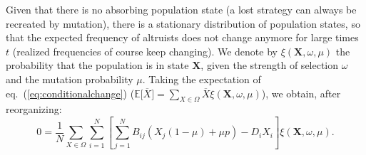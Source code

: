 \documentclass[11pt, letterpaper]{article}
\renewcommand{\eqref}[1]{\textup{{\normalfont eq.~(\ref{#1}}\normalfont)}}
\newcommand{\Esp}[1]{\mathbb{E}\big[ #1\big]}%
\begin{document}
Given that there is no absorbing population state (a lost strategy can always be recreated by mutation), there is a stationary distribution of population states, so that the expected frequency of altruists does not change anymore for large times~$t$ (realized frequencies of course keep changing). We denote by $\xi(\mathbf{X}, \omega, \mu)$ the probability that the population is in state $\mathbf{X}$, given the strength of selection $\omega$ and the mutation probability $\mu$. Taking the expectation of \eqref{eq:conditionalchange} ($\Esp{\overline{X}} = \sum_{X \in \Omega} \overline{X}\xi(\mathbf{X}, \omega, \mu)$), we obtain, after reorganizing:
\begin{equation}\label{eq:statdist}
0 = \frac{1}{N} \sum_{X\in \Omega} \sum_{i=1}^N \left[ \sum_{j=1}^N B_{ij} \left( X_j (1-\mu) + \mu p \right) -D_i X_i \right] \xi(\mathbf{X}, \omega, \mu). 
\end{equation}
\end{document}
